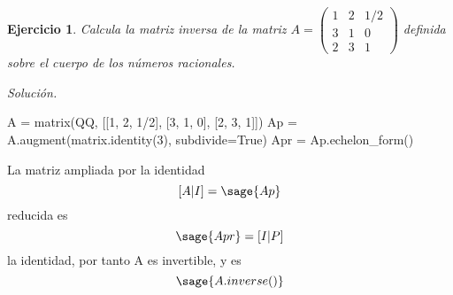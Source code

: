 \documentclass{amsart}
\newtheorem{ejercicio}{Ejercicio}
\begin{document}
\begin{ejercicio}
Calcula la matriz inversa de la matriz 
$A = \left(\begin{array}{ccc} 1 & 2 & 1/2 \\ 3 & 1 & 0 \\ 2 & 3 & 1 \end{array}\right)$ 
definida sobre el cuerpo de los números racionales. 
\end{ejercicio}
{\it Solución.}


\begin{sageblock}
	A = matrix(QQ, [[1, 2, 1/2], [3, 1, 0], [2, 3, 1]])
	Ap = A.augment(matrix.identity(3), subdivide=True)
	Apr = Ap.echelon_form()
\end{sageblock}

La matriz ampliada por la identidad
$$
	[A|I] = \sage{Ap}
$$
reducida es
$$
	\sage{Apr} = [I|P]
$$
la identidad, por tanto A es invertible, y es
$$
	\sage{A.inverse()}
$$

\end{document}
